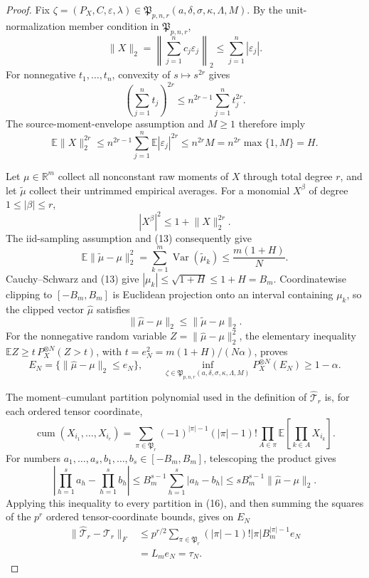 \documentclass{article}
\begin{document}
\begin{proof}
Fix \(\zeta=(P_X,C,\varepsilon,\lambda)\in\mathfrak P_{p,n,r}(a,\delta,\sigma,\kappa,\Lambda,M)\). By the unit-normalization member condition in \(\mathfrak P_{p,n,r}\),
\[
 \lVert X\rVert_2
 =\left\lVert\sum_{j=1}^nc_j\varepsilon_j\right\rVert_2
 \le\sum_{j=1}^n|\varepsilon_j|.
\]
For nonnegative \(t_1,\ldots,t_n\), convexity of \(s\mapsto s^{2r}\) gives
\[
 \left(\sum_{j=1}^nt_j\right)^{2r}
 \le n^{2r-1}\sum_{j=1}^nt_j^{2r}.
\]
The source-moment-envelope assumption and \(M\ge1\) therefore imply
\[
 \mathbb E\lVert X\rVert_2^{2r}
 \le n^{2r-1}\sum_{j=1}^n\mathbb E|\varepsilon_j|^{2r}
 \le n^{2r}M
 =n^{2r}\max\{1,M\}=H.
 \tag{13}
\]

Let \(\mu\in\mathbb R^m\) collect all nonconstant raw moments of \(X\) through total degree \(r\), and let \(\widetilde\mu\) collect their untrimmed empirical averages. For a monomial \(X^\beta\) of degree \(1\le|\beta|\le r\),
\[
 |X^\beta|^2\le1+\lVert X\rVert_2^{2r}.
\]
The iid-sampling assumption and (13) consequently give
\[
 \mathbb E\lVert\widetilde\mu-\mu\rVert_2^2
 =\sum_{k=1}^m\operatorname{Var}(\widetilde\mu_k)
 \le\frac{m(1+H)}N.
 \tag{14}
\]
Cauchy--Schwarz and (13) give \(|\mu_k|\le\sqrt{1+H}\le1+H=B_m\). Coordinatewise clipping to \([-B_m,B_m]\) is Euclidean projection onto an interval containing \(\mu_k\), so the clipped vector \(\widehat\mu\) satisfies
\[
 \lVert\widehat\mu-\mu\rVert_2
 \le\lVert\widetilde\mu-\mu\rVert_2.
\]
For the nonnegative random variable \(Z=\lVert\widehat\mu-\mu\rVert_2^2\), the elementary inequality \(\mathbb EZ\ge t\,P_X^{\otimes N}(Z>t)\), with \(t=e_N^2=m(1+H)/(N\alpha)\), proves
\[
 E_N=\{\lVert\widehat\mu-\mu\rVert_2\le e_N\},
 \qquad
 \inf_{\zeta\in\mathfrak P_{p,n,r}(a,\delta,\sigma,\kappa,\Lambda,M)}
 P_X^{\otimes N}(E_N)\ge1-\alpha.
 \tag{15}
\]

The moment--cumulant partition polynomial used in the definition of \(\widehat{\mathcal T}_r\) is, for each ordered tensor coordinate,
\[
 \operatorname{cum}(X_{i_1},\ldots,X_{i_r})
 =\sum_{\pi\in\mathfrak P_r}(-1)^{|\pi|-1}(|\pi|-1)!
 \prod_{A\in\pi}\mathbb E\!\left[\prod_{k\in A}X_{i_k}\right].
 \tag{16}
\]
For numbers \(a_1,\ldots,a_s,b_1,\ldots,b_s\in[-B_m,B_m]\), telescoping the product gives
\[
 \left|\prod_{h=1}^sa_h-\prod_{h=1}^sb_h\right|
 \le B_m^{s-1}\sum_{h=1}^s|a_h-b_h|
 \le sB_m^{s-1}\lVert\widehat\mu-\mu\rVert_2.
\]
Applying this inequality to every partition in (16), and then summing the squares of the \(p^r\) ordered tensor-coordinate bounds, gives on \(E_N\)
\[
 \begin{aligned}
 \lVert\widehat{\mathcal T}_r-\mathcal T_r\rVert_F
 &\le p^{r/2}
 \sum_{\pi\in\mathfrak P_r}(|\pi|-1)!|\pi|B_m^{|\pi|-1}e_N\\
 &=L_me_N=\tau_N.
 \end{aligned}
 \tag{17}
\]


\end{proof}
\end{document}
